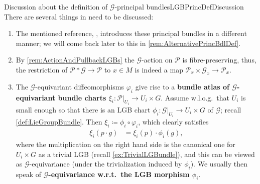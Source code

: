 \documentclass[reqno,a4paper,oneside]{amsart}
\theoremstyle{plain}
\theoremstyle{remark}
\theoremstyle{definition}
\begin{document}
\begin{remarks}{Discussion about the definition of $\mathcal{G}$-principal bundles}{LGBPrincDefDiscussion}
There are several things in need to be discussed:
\begin{enumerate}
	\item The mentioned reference, \cite{GroupoidBasedPrincipalBundles}, introduces these principal bundles in a different manner; we will come back later to this in \ref{rem:AlternativePrincBdlDef}.
	\item By \ref{rem:ActionAndPullbackLGBs} the $\mathcal{G}$-action on $\mathcal{P}$ is fibre-preserving, thus, the restriction of $\mathcal{P}*\mathcal{G} \to \mathcal{P}$ to $x \in M$ is indeed a map $\mathcal{P}_x \times \mathcal{G}_x \to \mathcal{P}_x$.
	\item The $\mathcal{G}$-equivariant diffeomorphisms $\varphi_i$ give rise to a \textbf{bundle atlas of $\mathcal{G}$-equivariant bundle charts $\xi_i\colon \mathcal{P}|_{U_i} \to U_i \times G$}. Assume w.l.o.g.\ that $U_i$ is small enough so that there is an LGB chart $\phi_i\colon \mathcal{G}|_{U_i} \to U_i \times G$ of $\mathcal{G}$; recall \ref{def:LieGroupBundle}. Then $\xi_i \coloneqq \phi_i \circ \varphi_i$, which clearly satisfies
	\begin{align*}
	\xi_i(p \cdot g)
	&=
	\xi_i(p) \cdot \phi_i(g),
	\end{align*}
	where the multiplication on the right hand side is the canonical one for $U_i \times G$ as a trivial LGB (recall \ref{ex:TrivialLGBundle}),
	and this can be viewed as $\mathcal{G}$-equivariance (under the trivialization induced by $\phi_i$). We usually then speak of \textbf{$\mathcal{G}$-equivariance w.r.t.\ the LGB morphism $\phi_i$}.
	

\end{enumerate}
\end{remarks}
\end{document}
